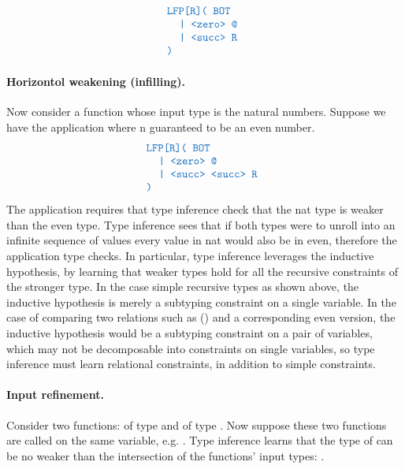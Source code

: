 \documentclass[acmsmall]{acmart}
\theoremstyle{definition}
\begin{document}
\[
  \begin{array}[t]{@{} l}
      \obj{LFP[R]( BOT} 
      \\
      \I \obj{| <zero> @}
      \\
      \I \obj{| <succ> R}
      \\
      \obj{)} 
  \end{array}
\]


\paragraph{Horizontol weakening (infilling).} 
Now consider a function  whose input type is the natural numbers. 
Suppose we have the application  where n guaranteed to be an even number.
\[
  \begin{array}[t]{@{} l}
      \obj{LFP[R]( BOT} 
      \\
      \I \obj{| <zero> @}
      \\
      \I \obj{| <succ> <succ> R}
      \\
      \obj{)} 
  \end{array}
\]
The application requires that type inference check that the nat type is weaker than the even type. 
Type inference sees that if both types were to unroll into an infinite sequence of values
every value in nat would also be in even, therefore the application type checks. 
In particular, type inference leverages the inductive hypothesis, by learning that weaker 
types hold for all the recursive constraints of the stronger type. 
In the case simple recursive types as shown above, the inductive hypothesis is merely a subtyping constraint
on a single variable.
In the case of comparing two relations such as () and a corresponding even version, 
the inductive hypothesis would be a subtyping constraint on a pair of variables, which may not be decomposable into
constraints on single variables, so type inference must learn relational constraints, in addition to simple constraints. 


\paragraph{Input refinement.}
Consider two functions:  of type  and  of type . 
Now suppose these two functions are called on the same variable, e.g. .
Type inference learns that the type of  can be no weaker than the intersection
of the functions' input types: . 
\end{document}
